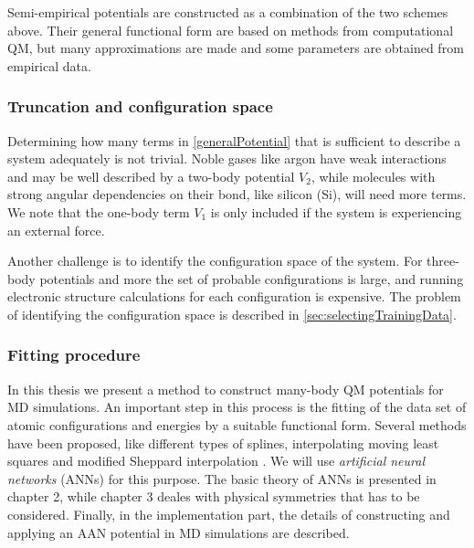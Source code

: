 \documentclass[twoside,english]{uiofysmaster}
\begin{document}
Semi-empirical potentials are constructed as a combination of the two schemes above. Their general functional form
are based on methods from computational QM, but many approximations are made and some parameters are obtained from empirical data. 

\subsubsection{Truncation and configuration space}
Determining how many terms in \eqref{generalPotential} that is sufficient to 
describe a system adequately is not trivial. Noble gases like argon have weak interactions and 
may be well described by a two-body potential $V_2$, while molecules with strong angular dependencies on their bond, like
silicon (Si), will need more terms. We note that the one-body term $V_1$ is only included if the system 
is experiencing an external force. 

Another challenge is to identify the
configuration space of the system. For three-body potentials and more the set of probable configurations is large, and 
running electronic structure calculations for each configuration is expensive. The problem of identifying the configuration
space is described in \autoref{sec:selectingTrainingData}. 

\subsubsection{Fitting procedure}
In this thesis we present a method to construct many-body QM potentials for MD simulations.
An important step in this process is the fitting of the data set of atomic configurations and energies by 
a suitable functional form. Several methods have been proposed, like different types of splines, 
interpolating moving least squares \cite{Dawes08} and modified Sheppard interpolation \cite{Ischtwan94}. 
We will use \textit{artificial neural networks} (ANNs) for this purpose. 
The basic theory of ANNs 
is presented in chapter 2, while chapter 3 deales with physical symmetries that has to be considered. 
Finally, in the implementation part, the details of constructing and applying an AAN potential in MD simulations are described. 
\end{document}
